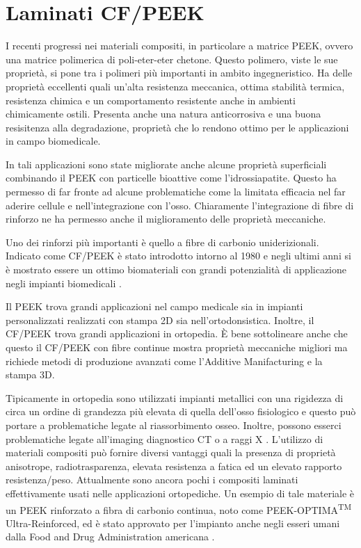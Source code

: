 \documentclass[a4paper,num-refs]{oup-contemporary}
\begin{document}
\section{Laminati CF/PEEK} 

I recenti progressi nei materiali compositi, in particolare a matrice PEEK, ovvero una matrice polimerica di poli-eter-eter chetone. Questo polimero, viste le sue proprietà, si pone tra i polimeri più importanti in ambito ingegneristico. Ha delle proprietà eccellenti quali un'alta resistenza meccanica, ottima stabilità termica, resistenza chimica e un comportamento resistente anche in ambienti chimicamente ostili. Presenta anche una natura anticorrosiva e una buona resisitenza alla degradazione, proprietà che lo rendono ottimo per le applicazioni in campo biomedicale. 

In tali applicazioni sono state migliorate anche alcune proprietà superficiali combinando il PEEK con particelle bioattive come l'idrossiapatite. Questo ha permesso di far fronte ad alcune problematiche come la limitata efficacia nel far aderire cellule e nell'integrazione con l'osso.  Chiaramente l'integrazione di fibre di rinforzo ne ha permesso anche il miglioramento delle proprietà meccaniche. 

Uno dei rinforzi più importanti è quello a fibre di carbonio uniderizionali. Indicato come CF/PEEK è stato introdotto intorno al 1980 e negli ultimi anni si è mostrato essere un ottimo biomateriali con grandi potenzialità di applicazione negli impianti biomedicali \citep{Verma}.    

Il PEEK trova grandi applicazioni nel campo medicale sia in impianti personalizzati realizzati con stampa 2D sia nell'ortodonsistica. Inoltre, il CF/PEEK trova grandi applicazioni in ortopedia.  È bene sottolineare anche che questo il CF/PEEK con fibre continue mostra proprietà meccaniche migliori ma richiede metodi di produzione avanzati come l'Additive Manifacturing e la stampa 3D. 




Tipicamente in ortopedia sono utilizzati impianti metallici con una rigidezza di circa un ordine di grandezza più elevata di quella dell'osso fisiologico e questo può portare a problematiche legate al riassorbimento osseo. Inoltre, possono esserci problematiche legate all'imaging diagnostico CT o a raggi X \citep{Rohner}. 
L'utilizzo di materiali compositi può fornire diversi vantaggi quali la presenza di proprietà anisotrope, radiotrasparenza, elevata resistenza a fatica ed un elevato rapporto resistenza/peso.  Attualmente sono ancora pochi i compositi laminati effettivamente usati nelle applicazioni ortopediche. Un esempio di tale materiale è un PEEK rinforzato a fibra di carbonio continua, noto come PEEK-OPTIMA\textsuperscript{TM}  Ultra-Reinforced, ed è stato approvato per l'impianto anche negli esseri umani dalla Food and Drug Administration americana \citep{PEEKOPTIMA}.
\end{document}
